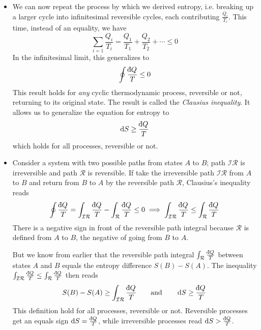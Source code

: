 \documentclass[11pt, a4paper]{article}
\newcommand{\eqtext}[1]{\qquad \text{#1} \qquad}
\newcommand{\diff}{\mathop{}\!\mathrm{d}} %
\newcommand{\dbar}{{\mathchar '26\mkern -11mu \mathrm{d}}} %
\begin{document}
\begin{itemize}
	\item We can now repeat the process by which we derived entropy, i.e. breaking up a larger cycle into infinitesimal reversible cycles, each contributing $ \frac{Q_{i}}{T_{i}} $. This time, instead of an equality, we have
	\begin{equation*}
		\sum_{i=1} \frac{Q_{i}}{T_{i}} = \frac{Q_{1}}{T_{1}} + \frac{Q_{2}}{T_{2}} + \cdots \leq 0
	\end{equation*}
	In the infinitesimal limit, this generalizes to
	\begin{equation*}
		\oint \frac{\dbar Q}{T} \leq 0
	\end{equation*}
	This result holds for \textit{any} cyclic thermodynamic process, reversible or not, returning to its original state. The result is called the \textit{Clausius inequality}. It allows us to generalize the equation for entropy to 
	\begin{equation*}
		\diff S \geq \frac{\dbar Q}{T}
	\end{equation*}
	which holds for all processes, reversible or not.
	
	\item Consider a system with two possible paths from states $ A $ to $ B $; path $\mathcal{IR}$ is irreversible and path $\mathcal{R}$ is reversible. If take the irreversible path $ \mathcal{IR} $ from $ A $ to $ B $ and return from $ B $ to $ A $ by the reversible path $\mathcal{R}$, Clausius's inequality reads
	\begin{equation*}
		\oint \frac{\dbar Q}{T} = \int_{\mathcal{IR}}\frac{\dbar Q}{T} - \int_{\mathcal{R}} \frac{\dbar Q}{T} \leq 0 \implies \int_{\mathcal{IR}}\frac{\dbar Q}{T} \leq \int_{\mathcal{R}}\frac{\dbar Q}{T} 
	\end{equation*}
	There is a negative sign in front of the reversible path integral because $ \mathcal{R} $ is defined from $ A $ to $ B $, the negative of going from $ B $ to $ A $.
	
	But we know from earlier that the reversible path integral $ \int_{\mathcal{R}} \frac{\dbar Q}{T} $ between states $ A $ and $ B $ equals the entropy difference $ S(B) - S(A)$. The inequality $ \int_{\mathcal{IR}}\frac{\dbar Q}{T} \leq \int_{\mathcal{R}}\frac{\dbar Q}{T}  $ then reads
	\begin{equation*}
		S(B) - S(A) \geq \int_{\mathcal{IR}}\frac{\dbar Q}{T}  \eqtext{and} \diff S \geq \frac{\dbar Q}{T}
	\end{equation*}
	This definition hold for all processes, reversible or not. Reversible processes get an equals sign $ \diff S = \frac{\dbar Q}{T} $, while irreversible processes read $ \diff S > \frac{\dbar Q}{T} $.
	

\end{itemize}
\end{document}
